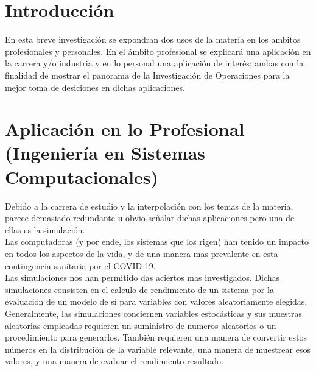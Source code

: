 \documentclass[letterpaper, 12pt]{article}
\begin{document}
    \newpage
    \begin{justify}
        \setcounter{page}{1}
        \section{Introducción}
        \justify
        En esta breve investigación se expondran dos usos de la materia en los ambitos profesionales y personales. En el ámbito profesional se explicará una aplicación
        en la carrera y/o industria y en lo personal una aplicación de interés; ambas con la finalidad de mostrar el panorama de la Investigación de Operaciones para la mejor toma 
        de desiciones en dichas aplicaciones.
        \section{Aplicación en lo Profesional (Ingeniería en Sistemas Computacionales)}
        \justify
        Debido a la carrera de estudio y la interpolación con los temas de la materia, parece demasiado redundante u obvio señalar dichas aplicaciones pero una de ellas es la simulación.
        \\Las computadoras (y por ende, los sistemas que los rigen) han tenido un impacto en todos los aspectos de la vida, y de una manera mas prevalente en esta contingencia sanitaria por el COVID-19.
        \\ \newline Las simulaciones nos han permitido das aciertos mas investigados. Dichas simulaciones consisten en el calculo de rendimiento de un sistema por la evaluación de un modelo de sí para variables con valores aleatoriamente
        elegidas. Generalmente, las simulaciones conciernen variables estocásticas y sus muestras aleatorias empleadas requieren un suministro de numeros aleatorios o un procedimiento para generarlos. También
        requieren una manera de convertir estos números en la distribución de la variable relevante, una manera de muestrear esos valores, y una manera de evaluar el rendimiento resultado. 

\end{justify}
\end{document}
